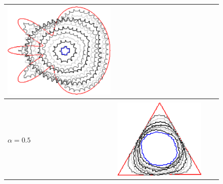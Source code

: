 \begin{figure}
\begin{tabular}{p{2.5em}ccc}
\includegraphics[scale=0.24]{figures/chapter6/radius-effect/flower/improve/len_pen0/radius-9/summary.pdf} \\
\hline \\
\multirow{2}{*}{$\alpha=0.5$}& \includegraphics[scale=0.25]{figures/chapter6/radius-effect/triangle/improve/len_pen0.5/radius-3/summary.pdf} &

\end{tabular}
\end{figure}
